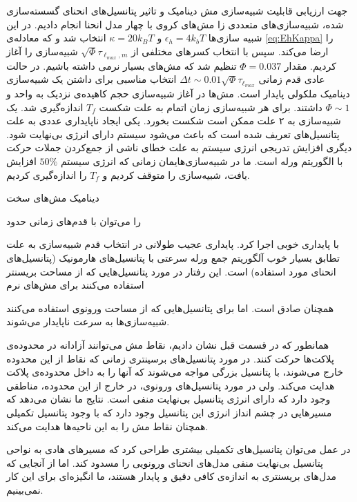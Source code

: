 جهت ارزیابی قابلیت شبیه‌سازی مش دینامیک و تاثیر پتانسیل‌های انحنای گسسته‌سازی شده، شبیه‌سازی‌های متعددی زا مش‌های کروی با چهار مدل انحنا انجام دادیم. در این شبیه سازی‌ها
$\epsilon_h=4k_bT$
و
$\kappa=20k_BT$
انتخاب شد و که معادله‌ی
\ref{eq:EhKappa}
را ارضا می‌کند. سپس با انتخاب کسر‌های مختلفی از
 $\sqrt{\Phi}\tau_{\ell_{max},m}$
شبیه‌سازی را آغاز کردیم. مقدار
$\Phi=0.037$
تنظیم شد که مش‌های بسیار نرمی داشته باشیم. در حالت عادی قدم زمانی
$\Delta t\sim0.01\sqrt{\Phi}\tau_{\ell_{max}}$
انتخاب مناسبی برای داشتن یک شبیه‌سازی دینامیک ملکولی پایدار است. مش‌ها در آغاز شبیه‌سازی حجم کاهیده‌ی نزدیک به واحد و 
$\Phi\sim1$
داشتند. برای هر شبیه‌سازی زمان اتمام به علت شکست 
$T_f$
اندازه‌گیری شد. یک شبیه‌سازی به ۲ علت ممکن است شکست بخورد. یکی ایجاد ناپایداری عددی به علت پتانسیل‌های تعریف شده است که باعث می‌شود سیستم دارای انرژی بی‌نهایت شود. دیگری افزایش تدریجی انرژی سیستم به علت خطای ناشی از جمع‌کردن جملات حرکت با الگوریتم ورله است. ما در شبیه‌سازی‌هایمان زمانی که انرژی سیستم 
$50\%$
افزایش یافت، شبیه‌سازی را متوقف کردیم و 
$T_f$
را اندازه‌گیری کردیم.

دینامیک مش‌های سخت 

را می‌توان با قدم‌های زمانی حدود

با پایداری خوبی اجرا کرد. پایداری عجیب طولانی در انتخاب قدم شبیه‌سازی به علت تطابق بسیار خوب آلگوریتم جمع ورله سرعتی با پتانسیل‌های هارمونیک (پتانسیل‌های انحنای مورد استفاده) است. این رفتار در مورد پتانسیل‌هایی که از مساحت بریسنتر استفاده می‌کنند برای مش‌های نرم

همچنان صادق است. اما برای پتانسیل‌هایی که از مساحت ورونوی استفاده می‌کنند شبیه‌سازی‌ها به سرعت ناپایدار می‌شوند. 

همانطور که در قسمت قبل نشان دادیم، نقاط مش می‌توانند آزادانه در محدوده‌ی پلاکت‌ها حرکت کنند. در مورد پتانسیل‌های برسینتری زمانی که نقاط از این محدوده خارج می‌شوند، با پتانسیل  بزرگی مواجه می‌شوند که آنها را به داخل محدوده‌ی پلاکت هدایت می‌کند. ولی در مورد پتانسیل‌های ورونوی، در خارج از این محدوده، مناطقی وجود دارد که دارای انرژی پتانسیل بی‌نهایت منفی است. نتایج ما نشان می‌دهد که مسیر‌هایی در چشم انداز انرژی این پتانسیل وجود دارد که با وجود پتانسیل‌ تکمیلی همچنان نقاط مش را به این ناحیه‌ها هدایت می‌کند. 

در عمل می‌توان پتانسیل‌های تکمیلی بیشتری طراحی کرد که مسیر‌های هادی به نواحی پتانسیل بی‌نهایت منفی مدل‌های انحنای ورونویی را مسدود کند. اما از آنجایی که مدل‌های بریسنتری به اندازه‌ی کافی دقیق و پایدار هستند، ما انگیزه‌ای برای این کار نمی‌بینیم.



























